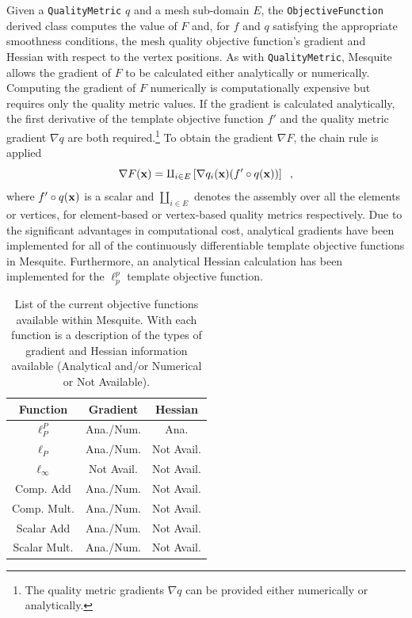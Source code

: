 \documentclass[letter]{report}
\begin{document}
Given a \texttt{QualityMetric} $q$ and a mesh sub-domain $E$, the
\texttt{ObjectiveFunction} derived class computes the value of 
$F$ and, for $f$ and $q$ satisfying the appropriate smoothness
conditions, the mesh quality objective function's gradient and Hessian
with respect to the vertex positions.  As with {\tt QualityMetric},
Mesquite allows the gradient of $F$ to be calculated either
analytically or numerically. Computing the gradient of $F$
numerically is computationally expensive but requires only the quality
metric values.  If the gradient is calculated analytically, the
first derivative of the template objective function $f'$ and the
quality metric gradient $\nabla q$ are both required.\footnote{The 
quality metric gradients $\nabla q$ can be provided either numerically 
or analytically.}
To obtain the gradient $\nabla F$, the chain rule is applied
\begin{equation}
\nabla F({\bf x}) = \amalg_{i \in E} \left[ \nabla q_i({\bf x}) 
 (f' \circ q({\bf x}) ) \right] \;\; ,
\end{equation}
where $ f' \circ q({\bf x})$ is a scalar and $\amalg_{i \in E}$ denotes the
assembly over all the elements or vertices, for element-based or 
vertex-based quality metrics respectively.
Due to the significant advantages in computational
cost, analytical gradients have been implemented for all of the
continuously differentiable template objective functions in Mesquite.
Furthermore, an analytical Hessian calculation has been implemented
for the $\ell_p^p$ template objective function.  

\begin{table}[htb]
\begin{center}
\begin{tabular}{|c|c|c|}
\hline
Function & Gradient & Hessian\\
\hline
$\ell_P^P$     & Ana./Num.&Ana.\\
$\ell_P$       & Ana./Num.& Not Avail.\\
$\ell_{\infty}$& Not Avail.& Not Avail.\\
Comp. Add      & Ana./Num.& Not Avail.\\
Comp. Mult.    & Ana./Num.& Not Avail.\\
Scalar Add     & Ana./Num.& Not Avail.\\
Scalar Mult.   & Ana./Num.& Not Avail.\\
\hline
\end{tabular}
\label{current-objfunc}
\caption{List of the current objective functions available within
Mesquite.  With each function is a description of the types of
gradient and Hessian information available (Analytical and/or Numerical
or Not Available).}
\end{center}
\end{table}
\end{document}
